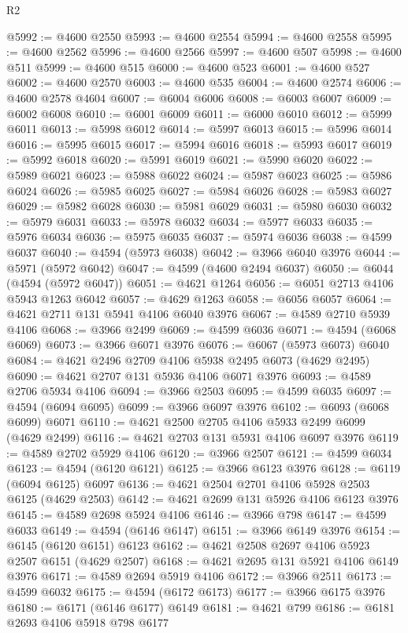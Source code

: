 \begin{lexlean}{R2}
\begin{coremodule}
@5992 := @4600 @2550
@5993 := @4600 @2554
@5994 := @4600 @2558
@5995 := @4600 @2562
@5996 := @4600 @2566
@5997 := @4600 @507
@5998 := @4600 @511
@5999 := @4600 @515
@6000 := @4600 @523
@6001 := @4600 @527
@6002 := @4600 @2570
@6003 := @4600 @535
@6004 := @4600 @2574
@6006 := @4600 @2578 @4604
@6007 := @6004 @6006
@6008 := @6003 @6007
@6009 := @6002 @6008
@6010 := @6001 @6009
@6011 := @6000 @6010
@6012 := @5999 @6011
@6013 := @5998 @6012
@6014 := @5997 @6013
@6015 := @5996 @6014
@6016 := @5995 @6015
@6017 := @5994 @6016
@6018 := @5993 @6017
@6019 := @5992 @6018
@6020 := @5991 @6019
@6021 := @5990 @6020
@6022 := @5989 @6021
@6023 := @5988 @6022
@6024 := @5987 @6023
@6025 := @5986 @6024
@6026 := @5985 @6025
@6027 := @5984 @6026
@6028 := @5983 @6027
@6029 := @5982 @6028
@6030 := @5981 @6029
@6031 := @5980 @6030
@6032 := @5979 @6031
@6033 := @5978 @6032
@6034 := @5977 @6033
@6035 := @5976 @6034
@6036 := @5975 @6035
@6037 := @5974 @6036
@6038 := @4599 @6037
@6040 := @4594 (@5973 @6038)
@6042 := @3966 @6040 @3976
@6044 := @5971 (@5972 @6042)
@6047 := @4599 (@4600 @2494 @6037)
@6050 := @6044 (@4594 (@5972 @6047))
@6051 := @4621 @1264
@6056 := @6051 @2713 @4106 @5943 @1263 @6042
@6057 := @4629 @1263
@6058 := @6056 @6057
@6064 := @4621 @2711 @131 @5941 @4106 @6040 @3976
@6067 := @4589 @2710 @5939 @4106
@6068 := @3966 @2499
@6069 := @4599 @6036
@6071 := @4594 (@6068 @6069)
@6073 := @3966 @6071 @3976
@6076 := @6067 (@5973 @6073) @6040
@6084 := @4621 @2496 @2709 @4106 @5938 @2495 @6073 (@4629 @2495)
@6090 := @4621 @2707 @131 @5936 @4106 @6071 @3976
@6093 := @4589 @2706 @5934 @4106
@6094 := @3966 @2503
@6095 := @4599 @6035
@6097 := @4594 (@6094 @6095)
@6099 := @3966 @6097 @3976
@6102 := @6093 (@6068 @6099) @6071
@6110 := @4621 @2500 @2705 @4106 @5933 @2499 @6099 (@4629 @2499)
@6116 := @4621 @2703 @131 @5931 @4106 @6097 @3976
@6119 := @4589 @2702 @5929 @4106
@6120 := @3966 @2507
@6121 := @4599 @6034
@6123 := @4594 (@6120 @6121)
@6125 := @3966 @6123 @3976
@6128 := @6119 (@6094 @6125) @6097
@6136 := @4621 @2504 @2701 @4106 @5928 @2503 @6125 (@4629 @2503)
@6142 := @4621 @2699 @131 @5926 @4106 @6123 @3976
@6145 := @4589 @2698 @5924 @4106
@6146 := @3966 @798
@6147 := @4599 @6033
@6149 := @4594 (@6146 @6147)
@6151 := @3966 @6149 @3976
@6154 := @6145 (@6120 @6151) @6123
@6162 := @4621 @2508 @2697 @4106 @5923 @2507 @6151 (@4629 @2507)
@6168 := @4621 @2695 @131 @5921 @4106 @6149 @3976
@6171 := @4589 @2694 @5919 @4106
@6172 := @3966 @2511
@6173 := @4599 @6032
@6175 := @4594 (@6172 @6173)
@6177 := @3966 @6175 @3976
@6180 := @6171 (@6146 @6177) @6149
@6181 := @4621 @799
@6186 := @6181 @2693 @4106 @5918 @798 @6177

\end{coremodule}
\end{lexlean}

